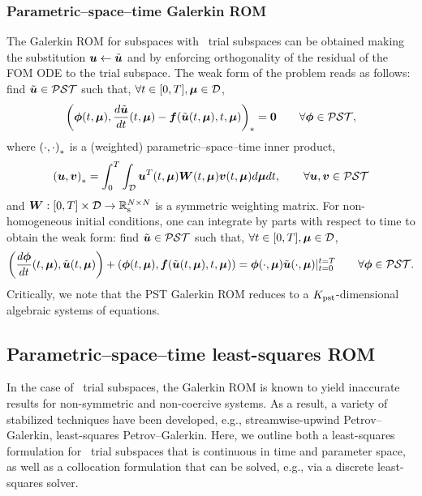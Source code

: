 \documentclass[3p,computermodern,10pt]{elsarticle}
\begin{document}
\subsubsection{Parametric--space--time Galerkin ROM}
The Galerkin ROM for subspaces with \parametricSpaceTimeAcronym\ trial subspaces can be obtained making the substitution $\boldsymbol u \leftarrow \tilde{\boldsymbol u}$ and by enforcing orthogonality of the residual of the FOM ODE to the trial subspace. The weak form of the problem reads as follows: find $\tilde{\boldsymbol u} \in \mathcal{PST}$ such that, $\forall t \in [0,T], \boldsymbol \mu \in \mathcal{D}$,
$$\left(  \boldsymbol \phi(t,\boldsymbol \mu) ,  \frac{d \tilde{\boldsymbol u}}{dt}(t,\boldsymbol \mu) - \boldsymbol f(\tilde{\boldsymbol u}(t,\boldsymbol \mu),t,\boldsymbol \mu)  \right)_{*} = \boldsymbol 0 \qquad \forall \boldsymbol \phi \in  \mathcal{PST} ,$$
where $\left( \cdot, \cdot \right)_{*}$ is a (weighted) parametric--space--time inner product, 
$$\left( \boldsymbol u,  \boldsymbol v \right)_{*} = \int_0^T \int _{\mathcal{D}} \boldsymbol u^T(t,\boldsymbol \mu) \boldsymbol W (t,\boldsymbol \mu)\boldsymbol v(t,\boldsymbol \mu)  d \boldsymbol \mu dt, \qquad \forall \boldsymbol u, \boldsymbol v \in \mathcal{PST}$$ 
and $\boldsymbol W : [0,T] \times \mathcal{D} \rightarrow \mathbb{R}_{\text{s}}^{N\times N}$ is a symmetric weighting matrix.
For non-homogeneous initial conditions, one can integrate by parts with respect to time to obtain the weak form: find $\tilde{\boldsymbol u} \in \mathcal{PST}$ such that, $\forall t \in [0,T], \boldsymbol \mu \in \mathcal{D}$,
$$\left( \frac{d\boldsymbol \phi}{dt}(t,\boldsymbol \mu) ,\tilde{\boldsymbol u}(t,\boldsymbol \mu) \right) + \left(\boldsymbol \phi(t,\boldsymbol \mu),  \boldsymbol f(\tilde{\boldsymbol u}(t,\boldsymbol \mu),t,\boldsymbol \mu) \right)  = \boldsymbol \phi(\cdot,\boldsymbol \mu) \tilde{\boldsymbol u}(\cdot,\boldsymbol \mu) |_{t=0}^{t=T}\qquad \forall \boldsymbol \phi \in  \mathcal{PST}.$$
Critically, we note that the PST Galerkin ROM reduces to a $K_{\text{pst}}$-dimensional algebraic systems of equations.  

\subsection{Parametric--space--time least-squares ROM}
In the case of \spatialAcronym\ trial subspaces, the Galerkin ROM is known to yield inaccurate results for non-symmetric and non-coercive systems. As a result, a variety of stabilized techniques have been developed, e.g., streamwise-upwind Petrov--Galerkin, least-squares Petrov--Galerkin. Here, we outline both a least-squares formulation for \parametricSpaceTimeAcronym\ trial subspaces that is continuous in time and parameter space, as well as a collocation formulation that can be solved, e.g., via a discrete least-squares solver. 
\end{document}
